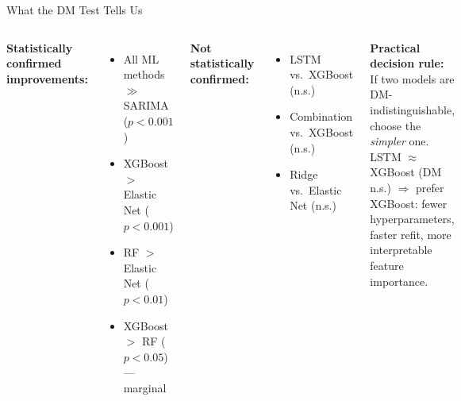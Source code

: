 \documentclass[aspectratio=169, 10pt]{beamer}
\begin{document}
\begin{frame}{What the DM Test Tells Us}
  \begin{columns}[T]
      \textbf{Statistically confirmed improvements:}
      \begin{itemize}\small
        \item All ML methods $\gg$ SARIMA ($p < 0.001$)
        \item XGBoost $>$ Elastic Net ($p < 0.001$)
        \item RF $>$ Elastic Net ($p < 0.01$)
        \item XGBoost $>$ RF ($p < 0.05$) --- marginal
      \end{itemize}
      \vspace{0.2cm}
      \textbf{Not statistically confirmed:}
      \begin{itemize}\small
        \item LSTM vs.\ XGBoost (n.s.)
        \item Combination vs.\ XGBoost (n.s.)
        \item Ridge vs.\ Elastic Net (n.s.)
      \end{itemize}
      \begin{keybox}
        {\small \textbf{Practical decision rule:}\\[3pt]
        If two models are DM-indistinguishable,
        choose the \emph{simpler} one.\\[4pt]
        LSTM $\approx$ XGBoost (DM n.s.) $\Rightarrow$
        prefer XGBoost: fewer hyperparameters,
        faster refit, more interpretable
        feature importance.}
      \end{keybox}
  \end{columns}
\end{frame}
\end{document}

